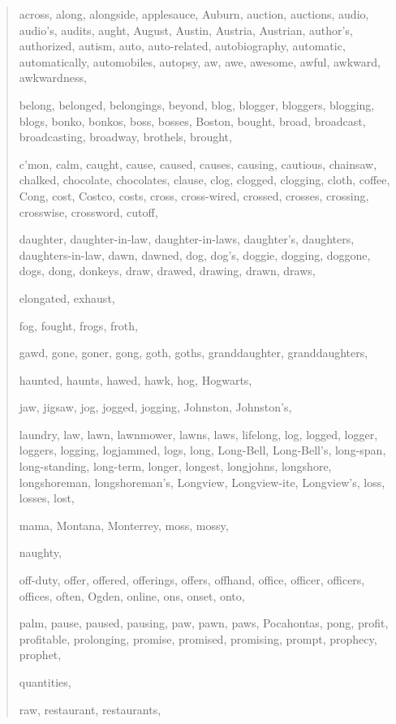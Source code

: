 \begin{quote}
    across, along, alongside, applesauce, Auburn, auction, auctions, audio, audio's, audits, aught, August, Austin, Austria, Austrian, author's, authorized, autism, auto, auto-related, autobiography, automatic, automatically, automobiles, autopsy, aw, awe, awesome, awful, awkward, awkwardness, 
    
    belong, belonged, belongings, beyond, blog, blogger, bloggers, blogging, blogs, bonko, bonkos, boss, bosses, Boston, bought, broad, broadcast, broadcasting, broadway, brothels, brought, 
    
    c'mon, calm, caught, cause, caused, causes, causing, cautious, chainsaw, chalked, chocolate, chocolates, clause, clog, clogged, clogging, cloth, coffee, Cong, cost, Costco, costs, cross, cross-wired, crossed, crosses, crossing, crosswise, crossword, cutoff, 
    
    daughter, daughter-in-law, daughter-in-laws, daughter's, daughters, daughters-in-law, dawn, dawned, dog, dog's, doggie, dogging, doggone, dogs, dong, donkeys, draw, drawed, drawing, drawn, draws, 
    
    elongated, exhaust, 
    
    fog, fought, frogs, froth, 
    
    gawd, gone, goner, gong, goth, goths, granddaughter, granddaughters, 
    
    haunted, haunts, hawed, hawk, hog, Hogwarts, 
    
    jaw, jigsaw, jog, jogged, jogging, Johnston, Johnston's,
    
    laundry, law, lawn, lawnmower, lawns, laws, lifelong, log, logged, logger, loggers, logging, logjammed, logs, long, Long-Bell, Long-Bell's, long-span, long-standing, long-term, longer, longest, longjohns, longshore, longshoreman, longshoreman's, Longview, Longview-ite, Longview's, loss, losses, lost, 
    
    mama, Montana, Monterrey, moss, mossy, 
    
    naughty, 
    
    off-duty, offer, offered, offerings, offers, offhand, office, officer, officers, offices, often, Ogden, online, ons, onset, onto, 
    
    palm, pause, paused, pausing, paw, pawn, paws, Pocahontas, pong, profit, profitable, prolonging, promise, promised, promising, prompt, prophecy, prophet, 
    
    quantities, 
    
    raw, restaurant, restaurants,
    

\end{quote}
